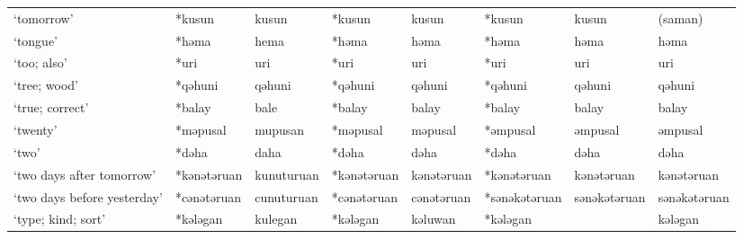 \begin{landscape}
\begin{longtable}[c]{@{}p{3cm}<{\raggedright}p{2.75cm}<{\raggedright}p{2.75cm}<{\raggedright}p{2.75cm}<{\raggedright}p{2.75cm}<{\raggedright}p{2.75cm}<{\raggedright}p{2.75cm}<{\raggedright}p{2.75cm}<{\raggedright}@{}}
`tomorrow'                                           & *kusun             & kusun                          & *kusun             & kusun                      & *kusun           & kusun                    & (saman)                           \\
`tongue'                                             & *həma              & hema                           & *həma              & həma                       & *həma            & həma                     & həma                              \\
`too; also'                                          & *uri               & uri                            & *uri               & uri                        & *uri             & uri                      & uri                               \\
`tree; wood'                                         & *qəhuni            & qəhuni                         & *qəhuni            & qəhuni                     & *qəhuni          & qəhuni                   & qəhuni                            \\
`true; correct'                                      & *balay             & bale                           & *balay             & balay                      & *balay           & balay                    & balay                             \\
`twenty'                                             & *məpusal           & mupusan                        & *məpusal           & məpusal                    & *əmpusal         & əmpusal                  & əmpusal                           \\
`two'                                                & *dəha              & daha                           & *dəha              & dəha                       & *dəha            & dəha                     & dəha                              \\
`two days after tomorrow'                            & *kənətəruan        & kunuturuan                     & *kənətəruan        & kənətəruan                 & *kənətəruan      & kənətəruan               & kənətəruan                        \\
`two days before yesterday'                          & *cənətəruan        & cunuturuan                     & *cənətəruan        & cənətəruan                 & *sənəkətəruan    & sənəkətəruan             & sənəkətəruan                      \\
`type; kind; sort'                                   & *kələgan           & kulegan                        & *kələgan           & kəluwan                    & *kələgan         &                          & kələgan                           \\

\end{longtable}
\end{landscape}
